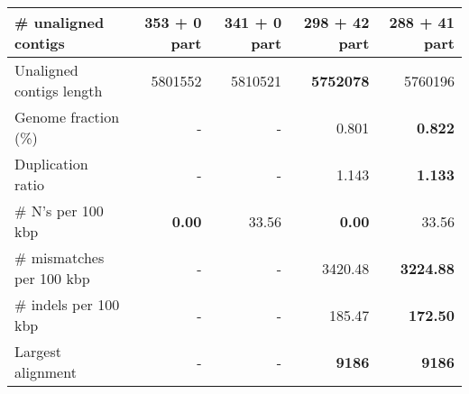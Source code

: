 \documentclass[12pt,a4paper]{article}
\begin{document}
\begin{table}[ht]
\begin{center}
\begin{tabular}{|l*{4}{|r}|}
\# unaligned contigs & 353 + 0 part & 341 + 0 part & 298 + 42 part & {\bf 288 + 41 part} \\ \hline
Unaligned contigs length & 5801552 & 5810521 & {\bf 5752078} & 5760196 \\ \hline
Genome fraction (\%) & - & - & 0.801 & {\bf 0.822} \\ \hline
Duplication ratio & - & - & 1.143 & {\bf 1.133} \\ \hline
\# N's per 100 kbp & {\bf 0.00} & 33.56 & {\bf 0.00} & 33.56 \\ \hline
\# mismatches per 100 kbp & - & - & 3420.48 & {\bf 3224.88} \\ \hline
\# indels per 100 kbp & - & - & 185.47 & {\bf 172.50} \\ \hline
Largest alignment & - & - & {\bf 9186} & {\bf 9186} \\ \hline
\end{tabular}
\end{center}
\end{table}
\end{document}
